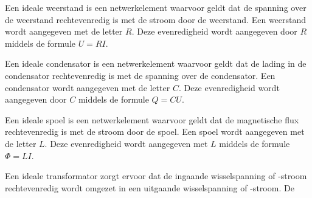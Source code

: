 \begin{minipage}{0.2\textwidth}
\centering
{}
\end{minipage}\hfill%
\begin{minipage}{0.78\textwidth}
Een ideale weerstand is een netwerkelement waarvoor geldt dat de spanning over de weerstand rechtevenredig is met de stroom door de weerstand. Een weerstand wordt aangegeven met de letter $R$. Deze evenredigheid wordt aangegeven door $R$ middels de formule $U=RI$.
\end{minipage}

\begin{minipage}{0.2\textwidth}
\centering
{}
\end{minipage}\hfill%
\begin{minipage}{0.78\textwidth}
Een ideale condensator is een netwerkelement waarvoor geldt dat de lading in de condensator rechtevenredig is met de spanning over de condensator. Een condensator wordt aangegeven met de letter $C$. Deze evenredigheid wordt aangegeven door $C$ middels de formule $Q=CU$.
\end{minipage}

\begin{minipage}{0.2\textwidth}
\centering
{}
\end{minipage}\hfill%
\begin{minipage}{0.78\textwidth}
Een ideale spoel is een netwerkelement waarvoor geldt dat de magnetische flux rechtevenredig is met de stroom door de spoel. Een spoel wordt aangegeven met de letter $L$. Deze evenredigheid wordt aangegeven met $L$ middels de formule $\Phi = LI$.
\end{minipage}

\begin{minipage}{0.2\textwidth}
\centering
{}
\end{minipage}\hfill%
\begin{minipage}{0.78\textwidth}
Een ideale transformator zorgt ervoor dat de ingaande wisselspanning of -stroom rechtevenredig wordt omgezet in een uitgaande wisselspanning of -stroom. De 
\end{minipage}

